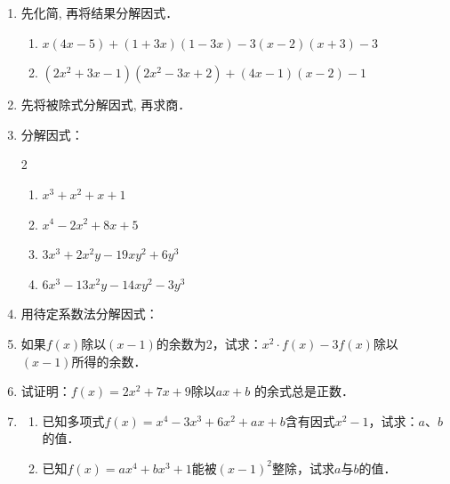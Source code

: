 \begin{enumerate}
\item 先化简, 再将结果分解因式．
\begin{enumerate}
    \item  $x(4 x-5)+(1+3 x)(1-3 x)-3(x-2)(x+3)-3$
\item  $\left(2 x^{2}+3 x-1\right)\left(2 x^{2}-3 x+2\right)+(4 x-1)(x-2)-1$
\end{enumerate}

\item 先将被除式分解因式, 再求商．
\begin{enumerate}
\end{enumerate}

\item 分解因式：
\begin{multicols}{2}
\begin{enumerate}
    \item $x^{3}+x^{2}+x+1$
\item $x^{4}-2 x^{2}+8 x+5$ 
\item $3 x^{3}+2 x^{2} y-19 x {y}^{2}+6 y^{3}$
\item $6 x^{3}-13 x^{2} y-14 x y^{2}-3 y^{3}$
\end{enumerate}
\end{multicols}
\item 用待定系数法分解因式：
\begin{enumerate}
\end{enumerate}


\item 如果$f(x)$除以$(x-1)$的余数为2，试求：$x^2\cdot f(x)-3f(x)$除以$(x-1)$所得的余数．

\item 试证明：$f(x)=2x^2+7x+9$除以$ax+b$ 的余式总是正数．
\item 
\begin{enumerate}
\item 已知多项式$f(x)=x^4-3x^3+6x^2+ax+b$含有因式$x^2-1$，试求：$a$、$b$的值．
\item 已知$f(x)=ax^4+bx^3+1$能被$(x-1)^2$整除，试求$a$与$b$的值．
\end{enumerate}


\end{enumerate}
